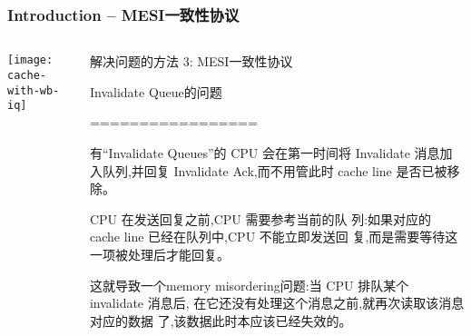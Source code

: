 \begin{frame}[plain]	
    \frametitle{Introduction -- MESI一致性协议}
    
    
    \begin{columns}
        
        \begin{column}{.4\textwidth}
            \texttt{[image: cache-with-wb-iq]}
        \end{column}
        \begin{column}{.6\textwidth}
            解决问题的方法 3: MESI一致性协议
            
            Invalidate  Queue的问题
            
            =================
            
有“Invalidate Queues”的 CPU 会在第一时间将 Invalidate
消息加入队列,并回复 Invalidate Ack,而不用管此时 cache line
是否已被移除。

CPU 在发送回复之前,CPU 需要参考当前的队
列:如果对应的 cache line 已经在队列中,CPU 不能立即发送回
复,而是需要等待这一项被处理后才能回复。

这就导致一个memory misordering问题:当 CPU 排队某个 invalidate 消息后,
在它还没有处理这个消息之前,就再次读取该消息对应的数据
了,该数据此时本应该已经失效的。

        \end{column}
    \end{columns}
    
\end{frame}


